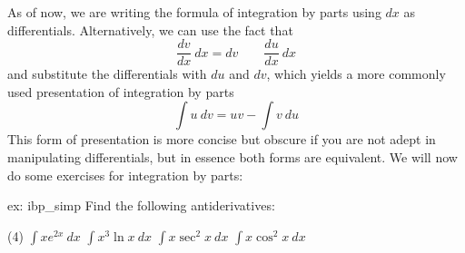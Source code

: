 As of now, we are writing the formula of integration by parts using $dx$ as differentials.  Alternatively, we can use the fact that 
\[\frac{dv}{dx}~dx = dv \qquad \frac{du}{dx}~dx\]
and substitute the differentials with $du$ and $dv$, which yields a more commonly used presentation of integration by parts 
\[\int u~dv = uv - \int v~du\]
This form of presentation is more concise but obscure if you are not adept in manipulating differentials, but in essence both forms are equivalent.  We will now do some exercises for integration by parts:
\begin{ex}[]{ex: ibp_simp}
    Find the following antiderivatives:
    \begin{tasks} (4)
        \task $\int xe^{2x}~dx$
        \task $\int x^3 \ln x~ dx$
        \task $\int x \sec^2x~dx$
        \task $\int x \cos^2x~dx$
    \end{tasks}
\end{ex}
